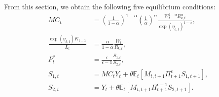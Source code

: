 \documentclass[12 pt, oneside]{article}
\theoremstyle{definition}
\theoremstyle{definition}
\theoremstyle{definition}
\newcommand{\E}{\mathbb{E}}
\begin{document}
From this section, we obtain the following five equilibrium conditions:
\begin{align}
  \label{eq:mc soln}
  MC_t & =  \left(\frac{1}{1 - \alpha}\right)^{1 - \alpha}\left(\frac{1}{\alpha}\right)^{\alpha}\frac{W_t^{1 - \alpha}R_{k, t}^{\alpha}}{ \exp(\eta_{a, t})^{1 - \alpha}},\\
  \label{eq:optimal capital labor ratio}
  \frac{\exp(\eta_{k, t})K_{t - 1}}{L_t} & =\frac{\alpha}{1 - \alpha} \frac{W_t}{R_{k, t}},\\
  \label{eq:real optimal reset price}
  P_t^* & = \frac{\epsilon}{\epsilon - 1}\frac{S_{1, t}}{S_{2, t}},\\
  \label{eq:numerator recursion}
  S_{1, t} & = MC_t Y_t + \theta\E_t[M_{t, t + 1} \Pi_{t + 1}^\epsilon S_{1, t + 1}],\\
  \label{eq:denominator recursion}
  S_{2, t} & =  Y_t + \theta\E_t[M_{t, t + 1} \Pi_{t + 1}^{\epsilon - 1} S_{2, t + 1}].
\end{align}
\end{document}
